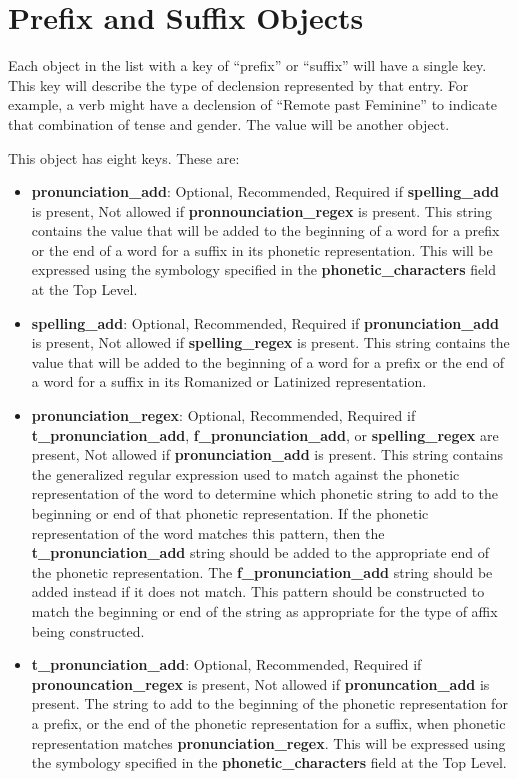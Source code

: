 \section{Prefix and Suffix Objects}

Each object in the list with a key of ``prefix'' or ``suffix'' will have a single key.  This key will describe the type of declension represented by that entry.  For example, a verb might have a declension of ``Remote past Feminine'' to indicate that combination of tense and gender.  The value will be another object.

This object has eight keys.  These are:
\begin{itemize}
	\item \textbf{pronunciation\_add}: Optional, Recommended, Required if \textbf{spelling\_add} is present, Not allowed if \textbf{pronnounciation\_regex} is present.  This string contains the value that will be added to the beginning of a word for a prefix or the end of a word for a suffix in its phonetic representation.  This will be expressed using the symbology specified in the \textbf{phonetic\_characters} field at the Top Level.
	\item \textbf{spelling\_add}: Optional, Recommended, Required if \textbf{pronunciation\_add} is present, Not allowed if \textbf{spelling\_regex} is present.  This string contains the value that will be added to the beginning of a word for a prefix or the end of a word for a suffix in its Romanized or Latinized representation.
	\item \textbf{pronunciation\_regex}: Optional, Recommended, Required if \textbf{t\_pronunciation\_add}, \textbf{f\_pronunciation\_add}, or \textbf{spelling\_regex} are present, Not allowed if \textbf{pronunciation\_add} is present.  This string contains the generalized regular expression used to match against the phonetic representation of the word to determine which phonetic string to add to the beginning or end of that phonetic representation.  If the phonetic representation of the word matches this pattern, then the \textbf{t\_pronunciation\_add} string should be added to the appropriate end of the phonetic representation.  The \textbf{f\_pronunciation\_add} string should be added instead if it does not match.  This pattern should be constructed to match the beginning or end of the string as appropriate for the type of affix being constructed.
	\item \textbf{t\_pronunciation\_add}: Optional, Recommended, Required if \textbf{pronouncation\_regex} is present, Not allowed if \textbf{pronuncation\_add} is present.  The string to add to the beginning of the phonetic representation for a prefix, or the end of the phonetic representation for a suffix, when phonetic representation matches \textbf{pronunciation\_regex}.  This will be expressed using the symbology specified in the \textbf{phonetic\_characters} field at the Top Level.

\end{itemize}
